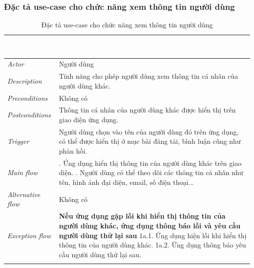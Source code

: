 \subsubsection{Đặc tả use-case cho chức năng xem thông tin người dùng}
\begin{center}
    \arrayrulewidth=2pt
    \begin{longtable}{
        |>{\raggedright\arraybackslash}p{3cm}
        |>{\raggedright\arraybackslash}p{13cm}
        |}
        \hline
        \rowcolor{cyan!75!black} \textcolor{white}{\textbf{Use-case name}} & \textcolor{white}{\textbf{XEM THÔNG TIN NGƯỜI DÙNG}}
        \\\hline
        \rowcolor{cyan!10!white} \textit{Actor} & Người dùng
        \\\hdashline
        \rowcolor{cyan!10!white} \textit{Description} & Tính năng cho phép người dùng xem thông tin cá nhân của người dùng khác.
        \\\hdashline
        \rowcolor{cyan!10!white} \textit{Preconditions} & Không có
        \\\hdashline
        \rowcolor{cyan!10!white} \textit{Postconditions} & Thông tin cá nhân của người dùng khác được hiển thị trên giao diện ứng dụng.
        \\\hdashline
        \rowcolor{cyan!10!white} \textit{Trigger} & Người dùng chọn vào tên của người dùng đó trên ứng dụng, có thể được hiển thị ở mục bài đăng tải, bình luận cũng như phản hồi.
        \\\hdashline
        \rowcolor{cyan!10!white} \textit{Main flow} &
        1. Ứng dụng hiển thị thông tin của người dùng khác trên giao diện. \newline
        2. Người dùng có thể theo dõi các thông tin cá nhân như tên, hình ảnh đại diện, email, số điện thoại...
        \\\hdashline
        \rowcolor{cyan!10!white} \textit{Alternative flow} & Không có
        \\\hdashline
        \rowcolor{cyan!10!white} \textit{Exception flow} &
        \textbf{Nếu ứng dụng gặp lỗi khi hiển thị thông tin của người dùng khác, ứng dụng thông báo lỗi và yêu cầu người dùng thử lại sau} \newline
        1a.1. Ứng dụng hiện lỗi khi hiển thị thông tin của người dùng khác. \newline
        1a.2. Ứng dụng thông báo yêu cầu người dùng thử lại sau.
        \\\hline
        \caption{Đặc tả use-case cho chức năng xem thông tin người dùng}
    \end{longtable}
\end{center}
